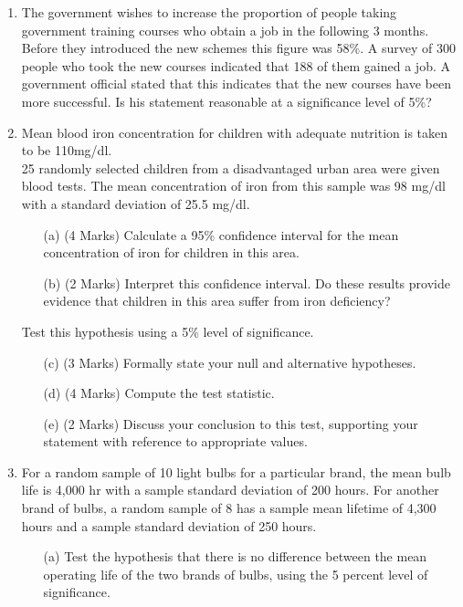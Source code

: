 \documentclass[]{article}
\begin{document}
\begin{enumerate}
\item The government wishes to increase the proportion of people taking government training courses who obtain a job in the following 3 months. Before they introduced the new schemes this figure was 58\%. A survey of 300 people who took the new courses indicated that 188 of them gained a job. A government official stated that this indicates that the new courses have been more successful. 
Is his statement reasonable at a significance level of 5\%?

\item Mean blood iron concentration for children with adequate nutrition is taken to be 110mg/dl. \\ 25 randomly selected children from a disadvantaged urban area were given blood tests. The mean concentration of iron from this sample was 98 mg/dl with a standard deviation of 25.5 mg/dl.
\begin{itemize}
	\item[(a)] (4 Marks) Calculate a 95\% confidence interval for the mean concentration of iron for children in this area. 
	\item[(b)](2 Marks) Interpret this confidence interval.  Do these results provide evidence that children in this area suffer from iron deficiency? 
\end{itemize}
\medskip
Test this hypothesis using a 5\% level of significance. 

\begin{itemize}
	\item[(c)](3 Marks) Formally state your null and alternative hypotheses.
	\item[(d)](4 Marks) Compute the test statistic.
	\item[(e)](2 Marks) Discuss your conclusion to this test, supporting your statement with reference to appropriate values.
\end{itemize}

\item For a random sample of 10 light bulbs for a particular brand, the mean bulb life is 4,000 hr with a sample
standard deviation of 200 hours. For another brand of bulbs, a random sample of 8 has a sample mean lifetime of 4,300 hours and a sample
standard deviation of 250 hours.\\

\begin{itemize}
	\item[(a)]Test the hypothesis that there is no difference between the mean operating life of the two brands of bulbs,
using the 5 percent level of significance.
\end{itemize}



\end{enumerate}
\end{document}
